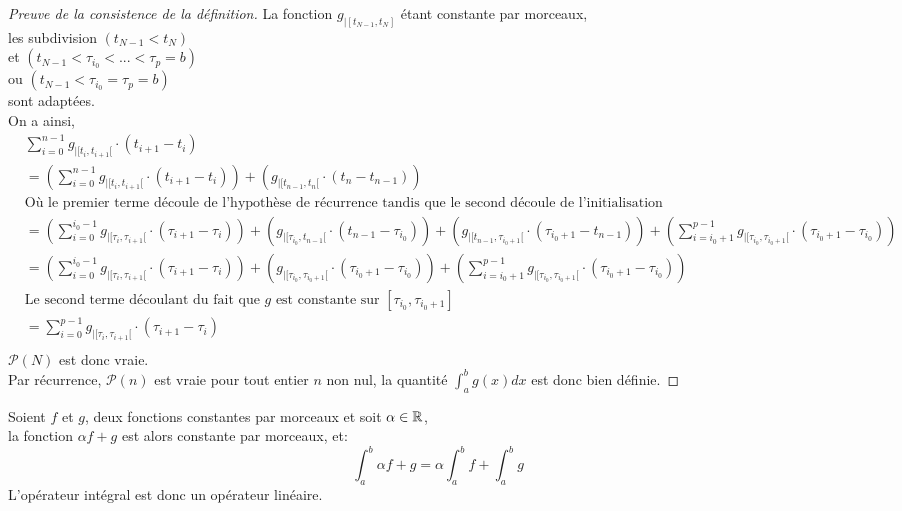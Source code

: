 \documentclass[../main.tex]{subfile}
\begin{document}
\begin{proof}[Preuve de la consistence de la définition]
	La fonction $g_{|[t_{N-1}, t_N]}$ étant constante par morceaux, \\
	les subdivision $(t_{N-1} < t_N)$\\
	et $(t_{N-1} < \tau_{i_0} < ... < \tau_p = b)$\\
	ou $(t_{N-1} < \tau_{i_0} = \tau_p = b)$\\
	sont adaptées.\\

	On a ainsi, \\
	$$
	\begin{aligned}
		&\sum\limits_{i=0}^{n-1} g_{|[t_i, t_{i+1}[} \cdot (t_{i+1} - t_i)\\
		&= \left( \sum\limits_{i=0}^{n-1} g_{|[t_i, t_{i+1}[} \cdot (t_{i+1} - t_i) \right) + \left( g_{|[t_{n-1}, t_{n}[} \cdot (t_{n} - t_{n-1}) \right)\\
		&\text{Où le premier terme découle de l'hypothèse de récurrence tandis que le second découle de l'initialisation} \\
		&= \left( \sum\limits_{i=0}^{i_0-1} g_{|[\tau_i, \tau_{i+1}[} \cdot (\tau_{i+1} - \tau_i) \right) + \left( g_{|[\tau_{i_0}, t_{n-1}[} \cdot (t_{n-1} - \tau_{i_0}) \right) + \left( g_{|[t_{n-1}, \tau_{i_0 + 1}[} \cdot (\tau_{i_0 + 1} - t_{n-1}) \right) + \left( \sum\limits_{i=i_0 + 1}^{p-1} g_{|[\tau_{i_0}, \tau_{i_0+1}[} \cdot (\tau_{i_0+1} - \tau_{i_0}) \right)\\
		&= \left( \sum\limits_{i=0}^{i_0-1} g_{|[\tau_i, \tau_{i+1}[} \cdot (\tau_{i+1} - \tau_i) \right) + \left( g_{|[\tau_{i_0}, \tau_{i_0+1}[} \cdot (\tau_{i_0+1} - \tau_{i_0}) \right) + \left( \sum\limits_{i=i_0 + 1}^{p-1} g_{|[\tau_{i_0}, \tau_{i_0+1}[} \cdot (\tau_{i_0+1} - \tau_{i_0}) \right)\\
		&\text{Le second terme découlant du fait que $g$ est constante sur } [\tau_{i_0}, \tau_{i_0+1}] \\
		&= \sum\limits_{i=0}^{p-1} g_{|[\tau_i, \tau_{i+1}[} \cdot (\tau_{i+1} - \tau_i)\\
	\end{aligned}
	$$
	$\mathcal{P}(N)$ est donc vraie.\\
	Par récurrence, $\mathcal{P}(n)$ est vraie pour tout entier $n$ non nul, la quantité $\int_a^b g(x)dx$ est donc bien définie.
\end{proof}

\begin{theo}
	Soient $f$ et $g$, deux fonctions constantes par morceaux et soit $\alpha \in \mathbb{R}$, \\
	la fonction $\alpha f + g$ est alors constante par morceaux, et:\\
	$$\int_a^b \alpha f + g = \alpha \int_a^b f + \int_a^b g$$
	L'opérateur intégral est donc un opérateur linéaire.
\end{theo}
\end{document}
